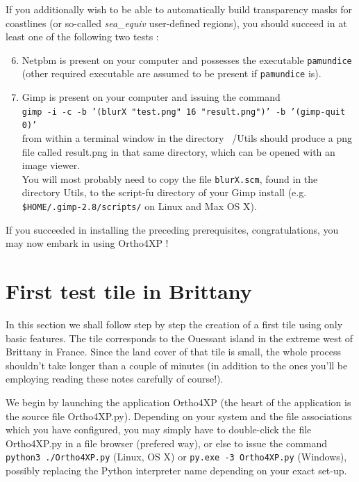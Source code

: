 \documentclass[12pt]{article}
\begin{document}
If you additionally wish to be able to automatically build transparency masks for coastlines (or so-called {\it sea\_equiv} user-defined regions), you should succeed in at least one of the following two tests :
\begin{enumerate}
  \setcounter{enumi}{5}
  \item Netpbm is present on your computer and possesses the executable {\tt pamundice} (other required executable are assumed to be present if {\tt pamundice} is).
  \item Gimp is present on your computer and issuing the command\\
  {\tt gimp -i -c -b '(blurX "test.png" 16 "result.png")' -b '(gimp-quit 0)'}\\
  from within a terminal window in the directory ~/Utils should produce a png file called result.png in that same directory, which can be opened with an image viewer.\\
  \hspace*{-1cm}\dbend\hspace*{0.3cm} You will most probably need to copy the file {\tt blurX.scm}, found in the directory Utils, to the script-fu directory of your Gimp install (e.g. {\tt \$HOME/.gimp-2.8/scripts/} on Linux and Max OS X).
\end{enumerate}
If you succeeded in installing the preceding prerequisites, congratulations, you may now embark in using Ortho4XP !

\section{First test tile in Brittany}

In this section we shall follow step by step the creation of a first tile using only basic features.
The tile corresponds to the Ouessant island in the extreme west of Brittany in France. Since the land cover of that tile is small, the whole process shouldn't take longer than a couple of minutes (in addition to the ones you'll be employing reading these notes carefully of course!).

We begin by launching the application Ortho4XP (the heart of the application is the source file Ortho4XP.py). Depending on your system and the file associations which you have configured, you may simply have to double-click the file Ortho4XP.py in a file browser (prefered way), or else to issue the command {\tt python3 ./Ortho4XP.py} (Linux, OS X) or {\tt py.exe -3 Ortho4XP.py} (Windows), possibly replacing the Python interpreter name depending on your exact set-up.
\end{document}
